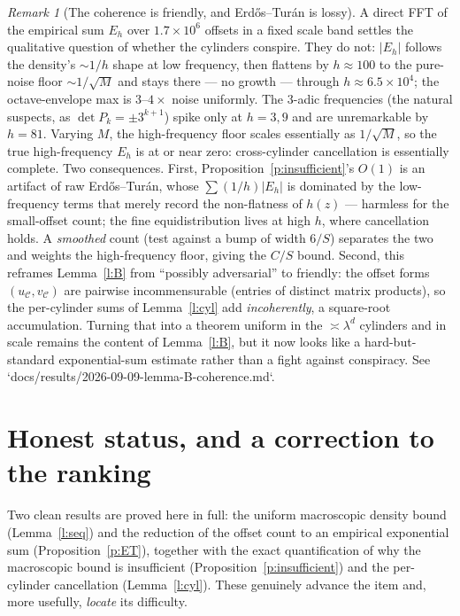 \documentclass[11pt]{article}
\theoremstyle{remark}\newtheorem{remark}{Remark}
\begin{document}
\begin{remark}[The coherence is friendly, and Erd\H os--Tur\'an is lossy]\label{r:friendly}
A direct FFT of the empirical sum $E_h$ over $1.7\times10^6$ offsets in a fixed
scale band settles the qualitative question of whether the cylinders conspire.
They do not: $|E_h|$ follows the density's $\sim1/h$ shape at low frequency,
then flattens by $h\approx100$ to the pure-noise floor $\sim1/\sqrt M$ and stays
there --- no growth --- through $h\approx6.5\times10^4$; the octave-envelope max
is $3$--$4\times$ noise uniformly. The $3$-adic frequencies (the natural
suspects, as $\det P_k=\pm3^{k+1}$) spike only at $h=3,9$ and are unremarkable
by $h=81$. Varying $M$, the high-frequency floor scales essentially as
$1/\sqrt M$, so the true high-frequency $E_h$ is at or near zero: cross-cylinder
cancellation is essentially complete. Two consequences. First,
Proposition~\ref{p:insufficient}'s $O(1)$ is an artifact of raw Erd\H
os--Tur\'an, whose $\sum(1/h)|E_h|$ is dominated by the low-frequency terms
that merely record the non-flatness of $h(z)$ --- harmless for the small-offset
count; the fine equidistribution lives at high $h$, where cancellation holds. A
\emph{smoothed} count (test against a bump of width $6/S$) separates the two and
weights the high-frequency floor, giving the $C/S$ bound. Second, this reframes
Lemma~\ref{l:B} from ``possibly adversarial'' to friendly: the offset forms
$(u_{\mathcal C},v_{\mathcal C})$ are pairwise incommensurable (entries of
distinct matrix products), so the per-cylinder sums of Lemma~\ref{l:cyl} add
\emph{incoherently}, a square-root accumulation. Turning that into a theorem
uniform in the $\asymp\lambda^d$ cylinders and in scale remains the content of
Lemma~\ref{l:B}, but it now looks like a hard-but-standard exponential-sum
estimate rather than a fight against conspiracy. See
`docs/results/2026-09-09-lemma-B-coherence.md`.
\end{remark}

\section{Honest status, and a correction to the ranking}
Two clean results are proved here in full: the uniform macroscopic density
bound (Lemma~\ref{l:seq}) and the reduction of the offset count to an empirical
exponential sum (Proposition~\ref{p:ET}), together with the exact quantification
of why the macroscopic bound is insufficient (Proposition~\ref{p:insufficient})
and the per-cylinder cancellation (Lemma~\ref{l:cyl}). These genuinely advance
the item and, more usefully, \emph{locate} its difficulty.
\end{document}
